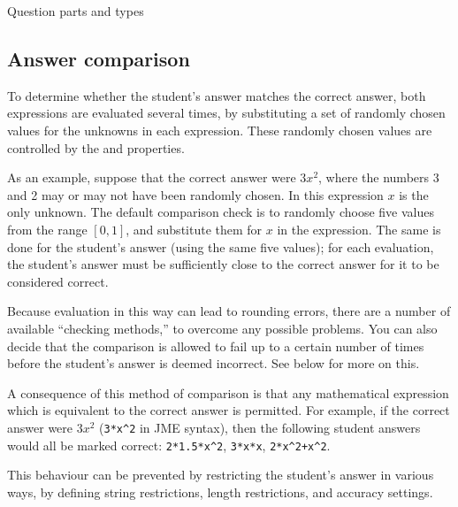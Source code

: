 \begin{chapter}{\label{cha:question_parts}Question parts and types}
  \subsection{\label{sec:answer_comparison}Answer comparison}
  To determine whether the student's answer matches the correct answer, both
  expressions are evaluated several times, by substituting a set of randomly
  chosen values for the unknowns in each expression.  These randomly chosen
  values are controlled by the  and
   properties.

  As an example, suppose that the correct answer were $3x^{2}$, where the numbers 3 and 2
  may or may not have been randomly chosen.  In this expression $x$ is the only
  unknown.  The default comparison check is to randomly choose five values from
  the range $[0,1]$, and substitute them for $x$ in the expression.  The same
  is done for the student's answer (using the same five values); for each
  evaluation, the student's answer must be sufficiently close to the correct
  answer for it to be considered correct.

  Because evaluation in this way can lead to rounding errors, there are a
  number of available ``checking methods,'' to overcome any possible problems.
  You can also decide that the comparison is allowed to fail up to a certain
  number of times before the student's answer is deemed incorrect.  See below
  for more on this.

  A consequence of this method of comparison is that any mathematical
  expression which is equivalent to the correct answer is permitted.  For
  example, if the correct answer were $3x^{2}$ (\verb"3*x^2" in JME syntax),
  then the following student answers would all be marked correct:
  \verb"2*1.5*x^2", \verb"3*x*x", \verb"2*x^2+x^2".

  This behaviour can be prevented by restricting the student's answer in
  various ways, \eg by defining string restrictions, length restrictions, and
  accuracy settings.


\end{chapter}
